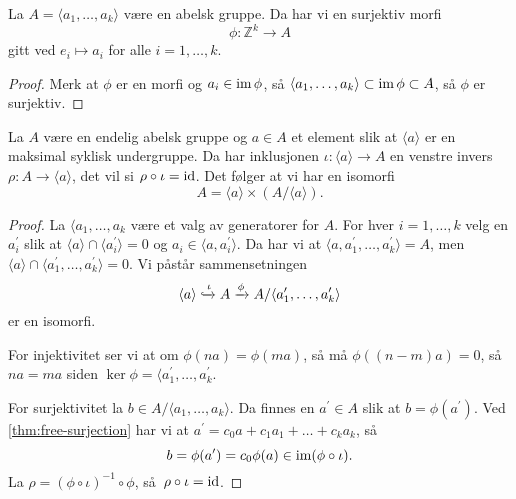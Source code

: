 \begin{lemma}\label{thm:free-surjection}
    La $A = \langle a_1,\dots,a_k\rangle$ være en abelsk gruppe.
    Da har vi en surjektiv morfi
    \[
        \phi\colon\mathbb Z^k\to A
    \]
    gitt ved $e_i\mapsto a_i$ for alle $i=1,\dots,k$.
\end{lemma}
\begin{proof}
    Merk at $\phi$ er en morfi og $a_i\in \operatorname{im}\phi$,
    så $\langle a_1,\dots,a_k\rangle\subset \operatorname{im}\phi\subset A$,
    så $\phi$ er surjektiv.
\end{proof}

\begin{corollary}\label{thm:maximal-cycle-split}
    La $A$ være en endelig abelsk gruppe og $a\in A$
    et element slik at $\langle a\rangle$ er en maksimal syklisk undergruppe.
    Da har inklusjonen $\iota \colon \langle a\rangle\to A$ en venstre invers
    $\rho\colon A\to \langle a\rangle$,
    det vil si $\rho\circ \iota = \operatorname{id}$.
    Det følger at vi har en isomorfi
    \[
        A = \langle a\rangle \times (A / \langle a\rangle).
    \]
\end{corollary}
\begin{proof}
    La $\langle a_1,\dots, a_k$ være et valg av generatorer for $A$.
    For hver $i = 1,\dots,k$ velg en $a_i^\prime$
    slik at $\langle a\rangle\cap \langle a_i^\prime\rangle = 0$
    og $a_i \in \langle a, a_i^\prime\rangle$.
    Da har vi at $\langle a, a_1^\prime,\dots,a_k^\prime\rangle = A$,
    men $\langle a\rangle \cap \langle a_1^\prime,\dots,a_k^\prime\rangle = 0$.
    Vi påstår sammensetningen
    \[
        \langle a\rangle
        \xhookrightarrow{\iota}
        A
        \xrightarrow{\phi}
        A / \langle a_1^\prime,\dots,a_k^\prime\rangle
    \]
    er en isomorfi.

    For injektivitet ser vi at om $\phi(na) = \phi(ma)$,
    så må $\phi((n - m)a) = 0$, så $na = ma$ siden
    $\ker\phi = \langle a_1^\prime, \dots, a_k^\prime$.

    For surjektivitet la $b\in A / \langle a_1,\dots,a_k\rangle$.
    Da finnes en $a^\prime\in A$ slik at
    $b = \phi(a^\prime)$.
    Ved \cref{thm:free-surjection} har vi at
    $a^\prime = c_0 a + c_1 a_1 + \dots + c_k a_k$,
    så
    \[
        b = \phi(a^\prime) = c_0\phi(a)\in \operatorname{im}(\phi\circ\iota).
    \]
    La $\rho = {(\phi\circ\iota)}^{-1}\circ \phi$,
    så $\rho\circ\iota = \operatorname{id}$.
\end{proof}

